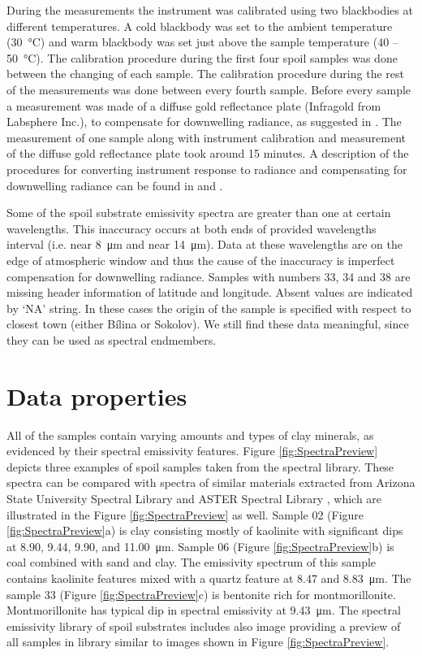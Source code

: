 \begin{appendices}
During the measurements the instrument was calibrated using two blackbodies at different temperatures. A cold blackbody was set to the ambient temperature (\SI{30}{\celsius}) and warm blackbody was set just above the sample temperature (40 -- \SI{50}{\celsius}). The calibration procedure during the first four spoil samples was done between the changing of each sample. The calibration procedure during the rest of the measurements was done between every fourth sample. Before every sample a measurement was made of a diffuse gold reflectance plate (Infragold from Labsphere Inc.), to compensate for downwelling radiance, as suggested in \cite{GV13}. The measurement of one sample along with instrument calibration and measurement of the diffuse gold reflectance plate took around 15 minutes. A description of the procedures for converting instrument response to radiance and compensating for downwelling radiance can be found in \cite{HJ98} and \cite{HK96}.

Some of the spoil substrate emissivity spectra are greater than one at certain wavelengths. This inaccuracy occurs at both ends of provided wavelengths interval (i.e. near \SI{8}{\micro\meter} and near \SI{14}{\micro\meter}). Data at these wavelengths are on the edge of atmospheric window and thus the cause of the inaccuracy is imperfect compensation for downwelling radiance. Samples with numbers 33, 34 and 38 are missing header information of latitude and longitude. Absent values are indicated by ‘NA’ string. In these cases the origin of the sample is specified with respect to closest town (either Bílina or Sokolov). We still find these data meaningful, since they can be used as spectral endmembers.


\section{Data properties}

All of the samples contain varying amounts and types of clay minerals, as evidenced by their spectral emissivity features. Figure \ref{fig:SpectraPreview} depicts three examples of spoil samples taken from the spectral library. These spectra can be compared with spectra of similar materials extracted from Arizona State University Spectral Library \cite{CB00} and ASTER Spectral Library \cite{BH09}, which are illustrated in the Figure \ref{fig:SpectraPreview} as well. Sample 02 (Figure \ref{fig:SpectraPreview}a) is clay consisting mostly of kaolinite with significant dips at 8.90, 9.44, 9.90, and \SI{11.00}{\micro\meter}. Sample 06 (Figure \ref{fig:SpectraPreview}b) is coal combined with sand and clay. The emissivity spectrum of this sample contains kaolinite features mixed with a quartz feature at 8.47 and \SI{8.83}{\micro\meter}. The sample 33 (Figure \ref{fig:SpectraPreview}c) is bentonite rich for montmorillonite. Montmorillonite has typical dip in spectral emissivity at \SI{9.43}{\micro\meter}. The spectral emissivity library of spoil substrates includes also image providing a preview of all samples in library similar to images shown in Figure \ref{fig:SpectraPreview}.


\end{appendices}
